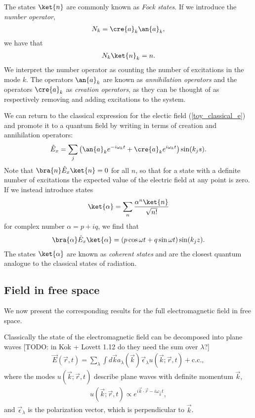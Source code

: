 The states $\ket{n}$ are commonly known as \textit{Fock states}. If we introduce the \textit{number operator},
\begin{align}
  N_k = \cre{a}_k\an{a}_k,
\end{align}
we have that
\begin{align}
  N_k\ket{n}_k = n.
\end{align}
We interpret the number operator as counting the number of excitations in the mode $k$. The operators $\an{a}_k$ are known as \textit{annihilation operators} and the operators $\cre{a}_k$ as \textit{creation operators}, as they can be thought of as respectively removing and adding excitations to the system. 

We can return to the classical expression for the electic field (\ref{toy_classical_e}) and promote it to a quantum field by writing in terms of creation and annihilation operators:
\begin{align}
  \hat{E}_x = \sum_j \left(\an{a}_k e^{-i\omega_k t} + \cre{a}_k e^{i\omega_k t}\right) \sin(k_j s).
\end{align}
Note that $\bra{n}\hat{E}_x\ket{n} = 0$ for all $n$, so that for a state with a definite number of excitations the expected value of the electric field at any point is zero. If we instead introduce states
\begin{align}
  \ket{\alpha} = \sum_n \frac{\alpha^n \ket{n}}{\sqrt{n!}}
\end{align}
for complex number $\alpha = p + iq$, we find that
\begin{align}
  \bra{\alpha}\hat{E}_x\ket{\alpha} = (p\cos\omega t + q\sin\omega t)\sin(k_j z).
\end{align}
The states $\ket{\alpha}$ are known as \textit{coherent states} and are the closest quantum analogue to the classical states of radiation.

\subsection{Field in free space}

We now present the corresponding results for the full electromagnetic field in free space.

Classically the state of the electromagnetic field can be decomposed into plane waves [TODO: in Kok + Lovett 1.12 do they need the sum over $\lambda$?]
\begin{align}
  \vec{E}(\vec{r}, t) = \sum_\lambda \int d\vec{k} a_\lambda(\vec{k})\vec{\epsilon}_\lambda u(\vec{k}; \vec{r}, t) + \text{c.c.},
\end{align}
where the modes $u(\vec{k}; \vec{r}, t)$ describe plane waves with definite momentum $\vec{k}$,
\begin{align}
  u(\vec{k}; \vec{r}, t) \propto e^{i\vec{k} \cdot \vec{r} - i\omega_\vec{k} t},
\end{align}
and $\vec{\epsilon}_\lambda$ is the polarization vector, which is perpendicular to $\vec{k}$.


